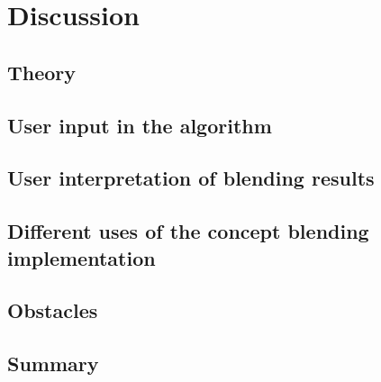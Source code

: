 
\chapter{Discussion} %

\label{Chapter8} %


\section{Theory}


\section{User input in the algorithm}


\section{User interpretation of blending results}


\section{Different uses of the concept blending implementation}


\section{Obstacles}


\section{Summary}

